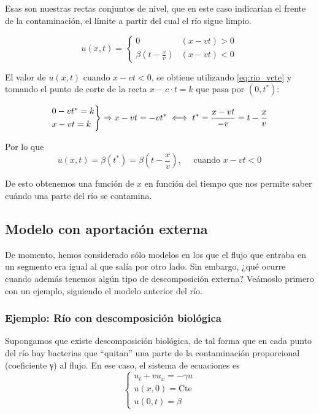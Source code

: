 		Esas son nuestras rectas conjuntos de nivel, que en este caso indicarían el frente de la contaminación, el límite a partir del cual el río sigue limpio.

		$$u(x,t) =
			\begin{cases}
				0                      & (x-vt) > 0 \\
				\beta(t - \frac{x}{v}) & (x-vt) < 0
			\end{cases}
		$$

		El valor de $u(x,t)$ cuando $x-vt < 0$, se obtiene utilizando \ref{eq:rio_vcte} y tomando el punto de corte de la recta $x-c \cdot t=k$ que pasa por $(0,t^*)$:

		$$
		\begin{rcases}
			0 - vt^{*} = k \\
			x - vt = k
		\end{rcases}
		 \Rightarrow x-vt = -vt^{*} \iff t^* = \frac{x-vt}{-v} = t - \frac{x}{v}$$

		Por lo que
		$$u(x,t) = \beta(t^*) = \beta(t - \frac{x}{v}), \quad \text{ cuando } x - vt < 0$$

		De esto obtenemos una función de $x$ en función del tiempo que nos permite saber cuándo una parte del río se contamina.

	\subsection{Modelo con aportación externa}

	De momento, hemos considerado sólo modelos en los que el flujo que entraba en un segmento era igual al que salía por otro lado. Sin embargo, ¿qué ocurre cuando además tenemos algún tipo de descomposición externa? Veámoslo primero con un ejemplo, siguiendo el modelo anterior del río.

	\subsubsection{Ejemplo: Río con descomposición biológica}

		Supongamos que existe descomposición biológica, de tal forma que en cada punto del río hay bacterias que ``quitan'' una parte de la contaminación proporcional (coeficiente γ) al flujo. En ese caso, el sistema de ecuaciones es \[
		\begin{cases}
		u_t + vu_x = -\gamma u \\
		u(x,0) = \text{Cte} \\
		u(0,t) = \beta
		\end{cases} \]

